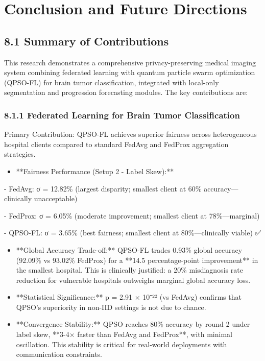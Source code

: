 \chapter{Conclusion and Future Directions}
\label{ch:8}


\section{8.1 Summary of Contributions}
This research demonstrates a comprehensive privacy-preserving medical imaging system combining federated learning with quantum particle swarm optimization (QPSO-FL) for brain tumor classification, integrated with local-only segmentation and progression forecasting modules. The key contributions are:


\subsection{8.1.1 Federated Learning for Brain Tumor Classification}
Primary Contribution: QPSO-FL achieves superior fairness across heterogeneous hospital clients compared to standard FedAvg and FedProx aggregation strategies.

\begin{itemize}
  \item **Fairness Performance (Setup 2 - Label Skew):**
\end{itemize}

- FedAvg: σ = 12.82\% (largest disparity; smallest client at 60\% accuracy—clinically unacceptable)

- FedProx: σ = 6.05\% (moderate improvement; smallest client at 78\%—marginal)

- QPSO-FL: σ = 3.65\% (best fairness; smallest client at 80\%—clinically viable) ✅

\begin{itemize}
  \item **Global Accuracy Trade-off:** QPSO-FL trades 0.93\% global accuracy (92.09\% vs 93.02\% FedProx) for a **14.5 percentage-point improvement** in the smallest hospital. This is clinically justified: a 20\% misdiagnosis rate reduction for vulnerable hospitals outweighs marginal global accuracy loss.
  \item **Statistical Significance:** p = 2.91 × 10⁻²² (vs FedAvg) confirms that QPSO's superiority in non-IID settings is not due to chance.
  \item **Convergence Stability:** QPSO reaches 80\% accuracy by round 2 under label skew, **3-4× faster than FedAvg and FedProx**, with minimal oscillation. This stability is critical for real-world deployments with communication constraints.
\end{itemize}


